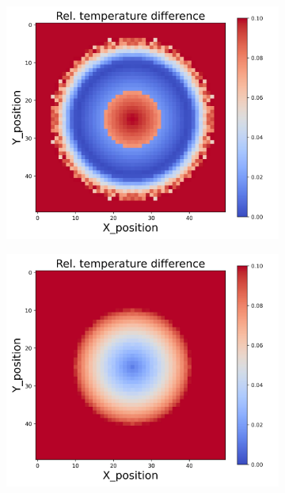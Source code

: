 \begin{figure}[h]
\begin{minipage}{\textwidth}
\begin{subfigure}{0.3\textwidth}
        \end{subfigure}
    \end{minipage}\\
    \begin{minipage}{\textwidth}
        \centering
        \begin{subfigure}{0.3\textwidth}
            \centering
            \includegraphics[width=\textwidth]{figures/raw_data/25/lin_square/T_bias.jpg}
        \end{subfigure}
        \begin{subfigure}{0.3\textwidth}
            \centering
            \includegraphics[width=\textwidth]{figures/raw_data/26/lin_square/T_bias.jpg}

\end{subfigure}
\end{minipage}
\end{figure}
